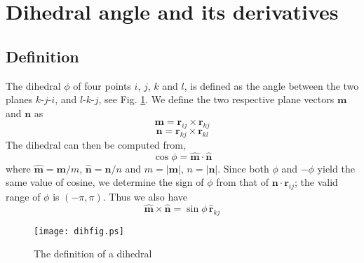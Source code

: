 \documentclass{article}
\begin{document}
\newcommand{\vct}[1]{\mathbf{#1}}
\newcommand{\vx}{\vct{x}}
\newcommand{\vy}{\vct{y}}
\newcommand{\vz}{\vct{z}}
\newcommand{\vm}{\vct{m}}
\newcommand{\vn}{\vct{n}}
\newcommand{\vr}{\vct{r}}
\newcommand{\vxh}{\hat{\vct{x}}}
\newcommand{\vyh}{\hat{\vct{y}}}
\newcommand{\vzh}{\hat{\vct{z}}}
\newcommand{\vmh}{\hat{\vct{m}}}
\newcommand{\vnh}{\hat{\vct{n}}}
\newcommand{\vrh}{\hat{\vct{r}}}
\newcommand{\vmhh}{\hat{\hat{\vct{m}}}}
\newcommand{\vnhh}{\hat{\hat{\vct{n}}}}
\newcommand{\diphi}{\nabla_i \phi}
\newcommand{\djphi}{\nabla_j \phi}
\newcommand{\dkphi}{\nabla_k \phi}
\newcommand{\dlphi}{\nabla_l \phi}

\section{Dihedral angle and its derivatives}

\subsection{Definition}

The dihedral $\phi$ of four points $i$, $j$, $k$ and $l$, 
is defined as the angle between the two planes 
$k$-$j$-$i$, and $l$-$k$-$j$, see Fig. \ref{dihfig}.
%
We define the two respective plane vectors $\vm$ and $\vn$ as
\begin{equation}
\vm = \vr_{ij} \times \vr_{kj}
\label{eq:m}
\end{equation}
%
\begin{equation}
\vn = \vr_{kj} \times \vr_{kl} 
\label{eq:n}
\end{equation}
%
The dihedral can then be computed from,
\begin{equation}
  \cos \phi = \vmh \cdot \vnh
  \label{eq:cosphi}
\end{equation}
%
where $\vmh = \vm/m$, $\vnh = \vn/n$
%
and $m = | \vm |$, $n = | \vn |$.
%
Since both $\phi$ and $-\phi$ yield the same value of cosine,
we determine the sign of $\phi$ from that of $\vn \cdot \vr_{ij}$;
the valid range of $\phi$ is $(-\pi, \pi)$.
Thus we also have 
\begin{equation}
  \vmh \times \vnh  = \sin \phi \, \vrh_{kj}
  \label{eq:sinphi}
\end{equation}

%
\begin{figure}[h]
\begin{center}
\texttt{[image: dihfig.ps]}
\caption{\label{dihfig}The definition of a dihedral}
\end{center}
\end{figure}
\end{document}
